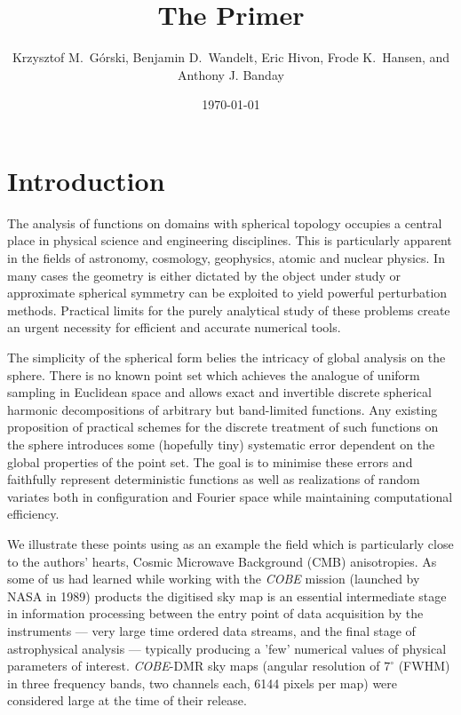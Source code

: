 \documentclass[12pt,twoside]{article}
\begin{document}
\title{The \healpix Primer}
\author{Krzysztof M.~G\'orski, Benjamin D.~Wandelt, Eric Hivon, Frode K.~Hansen,
and Anthony J. Banday}
%
\date{\today}

\frontpage
\tableofcontents
\newpage

\section{Introduction}

The analysis of functions on  domains with spherical topology occupies a
central place in physical science and engineering disciplines. 
This is particularly apparent in the fields of astronomy, cosmology, 
geophysics,  atomic and nuclear physics. In many cases the geometry is either
dictated by the object under study or approximate spherical symmetry can be
exploited to yield powerful perturbation methods. Practical
limits for the purely analytical study of these problems create
an urgent necessity for efficient and accurate numerical tools.

The 
simplicity of the spherical form belies the intricacy of global
analysis on the sphere. There is no known
point set which achieves the analogue of uniform sampling in Euclidean space and
allows exact and invertible discrete spherical harmonic decompositions
of arbitrary but band-limited functions. Any existing proposition of practical
schemes for the  discrete treatment of such functions 
on the sphere  introduces some (hopefully tiny) 
systematic error dependent on the global properties of
the point set. The goal is to minimise these errors and
faithfully represent deterministic functions as well as realizations of
random variates both
in configuration and Fourier space while maintaining computational efficiency.

We illustrate these points using as an example the field which is particularly 
close to the authors' hearts, Cosmic Microwave Background (CMB)
anisotropies. 
As some of us had learned while working with the {\it COBE} mission (launched by NASA in 1989) products
the digitised
sky map is an essential intermediate 
stage in information processing between 
the entry point of data acquisition by the 
instruments --- very large time ordered data streams,
and the final stage of astrophysical analysis --- 
typically producing a 
'few'
 numerical values
of physical parameters of interest. 
{\it COBE}-DMR sky maps (angular resolution of $7^\circ$ (FWHM) in
three frequency bands, two channels each, 6144 pixels per map)
were considered large at the time of their release.
\end{document}
